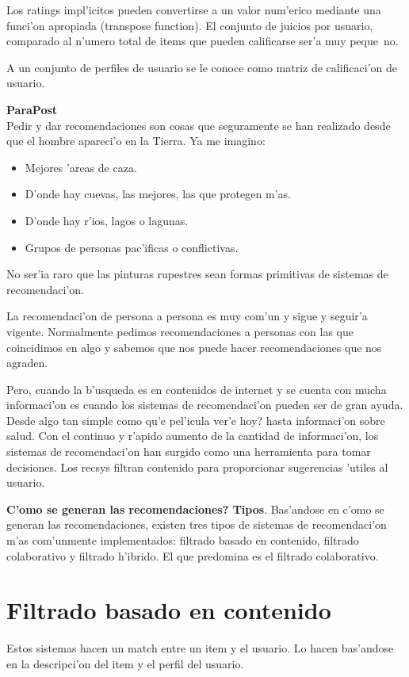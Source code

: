 \documentclass[11pt]{article}
\begin{document}
Los ratings impl'icitos pueden convertirse a un valor num'erico mediante una funci'on apropiada (transpose function). El conjunto de juicios por usuario, comparado al n'umero total de items que pueden calificarse ser'a muy peque~no.

A un conjunto de perfiles de usuario se le conoce como matriz de calificaci'on de usuario.

\medskip
\textbf{ParaPost} \\
Pedir y dar recomendaciones son cosas que seguramente se han realizado desde que el hombre apareci'o en la Tierra. Ya me imagino:

\begin{itemize}
\item Mejores 'areas de caza.
\item D'onde hay cuevas, las mejores, las que protegen m'as.
\item D'onde hay r'ios, lagos o lagunas.
\item Grupos de personas pac'ificas o conflictivas.
\end{itemize}

No ser'ia raro que las pinturas rupestres sean formas primitivas de sistemas de recomendaci'on.

La recomendaci'on de persona a persona es muy com'un y sigue y seguir'a vigente. Normalmente pedimos recomendaciones a personas con las que coincidimos en algo y sabemos que nos puede hacer recomendaciones que nos agraden.

Pero, cuando la b'usqueda es en contenidos de internet y se cuenta con mucha informaci'on es cuando los sistemas de recomendaci'on pueden ser de gran ayuda. Desde algo tan simple como \textquestiondown qu'e pel'icula ver'e hoy? hasta informaci'on sobre salud. Con el continuo y r'apido aumento de la cantidad de informaci'on, los sistemas de recomendaci'on han surgido como una  herramienta para tomar decisiones. Los recsys filtran contenido para proporcionar sugerencias 'utiles al usuario.

\medskip
\textbf{\textquestiondown C'omo se generan las recomendaciones? Tipos}. Bas'andose en c'omo se generan las recomendaciones, existen tres tipos de sistemas de recomendaci'on m'as com'unmente implementados: filtrado basado en contenido, filtrado colaborativo y filtrado h'ibrido. El que predomina es el filtrado colaborativo.

\section{Filtrado basado en contenido}
Estos sistemas hacen un match entre un item y el usuario. Lo hacen bas'andose en la descripci'on del item y el perfil del usuario.
\end{document}
